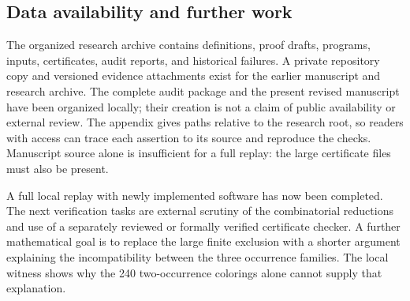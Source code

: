 \subsection*{Data availability and further work}
The organized research archive contains definitions, proof drafts,
programs, inputs, certificates, audit reports, and historical failures.
A private repository copy and versioned evidence attachments exist for
the earlier manuscript and research archive. The complete audit package
and the present revised manuscript have been organized locally; their
creation is not a claim of public availability or external review.
The appendix gives paths relative to the research root, so readers with
access can trace each assertion to its source and reproduce the checks.
Manuscript source alone is insufficient for a full replay: the large
certificate files must also be present.

A full local replay with newly implemented software has now been
completed. The next verification tasks are external scrutiny of the
combinatorial reductions and use of a separately reviewed or formally
verified certificate checker. A further mathematical goal is to replace the large finite
exclusion with a shorter argument explaining the incompatibility between
the three occurrence families. The local witness shows why the
240 two-occurrence colorings alone cannot supply that explanation.
